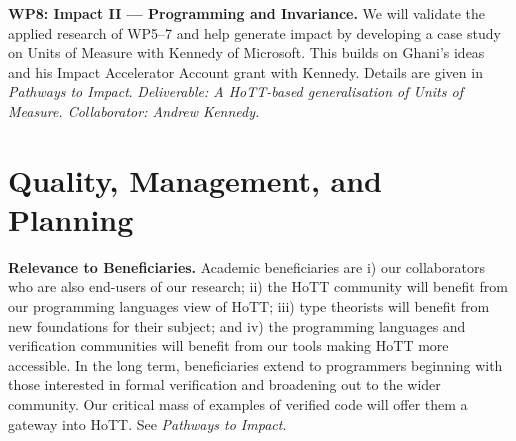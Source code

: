 \documentclass[a4paper,11pt]{article}
\begin{document}
{\bf WP8: Impact II --- Programming and Invariance.}  We will validate
the applied research of WP5--7 and help generate impact by developing a
case study on Units of Measure with Kennedy of Microsoft. This builds
on Ghani's ideas~\cite{uom} and his Impact Accelerator Account grant
with Kennedy. Details are given in {\em Pathways to Impact}. {\em
  Deliverable: A HoTT-based generalisation of Units of
  Measure. Collaborator: Andrew Kennedy.  }


\vspace*{-0.2in}

\section{Quality, Management, and Planning}

\vspace*{-0.1in}

{\bf Relevance to Beneficiaries.} Academic beneficiaries
are i) our collaborators who are also end-users of our research; ii)
the HoTT community will benefit from our programming languages
view of HoTT; iii) type theorists will benefit from new
foundations for their subject; and iv) the programming languages and
verification communities will benefit from our tools making HoTT more
accessible. In the long term, beneficiaries extend to
programmers beginning with those interested in formal
verification and broadening out to the wider community. Our critical
mass of examples of verified code will offer them a gateway
into HoTT. See {\em Pathways to Impact}.
 
\end{document}
